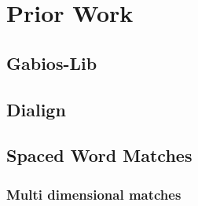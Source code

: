 \chapter{Prior Work}


\section{Gabios-Lib}

\section{Dialign}

\section{Spaced Word Matches}

\subsection{Multi dimensional matches}